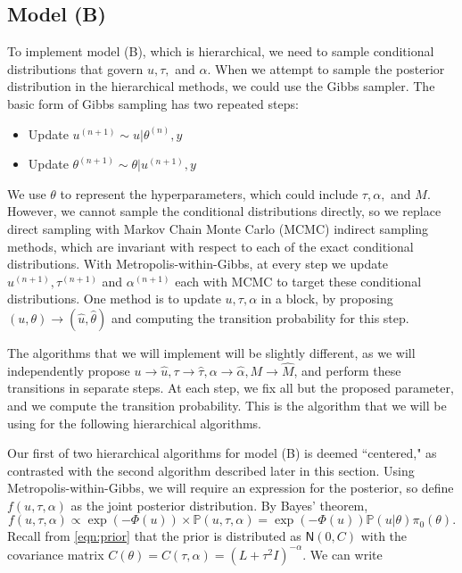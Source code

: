 \documentclass{siamart1116}
\begin{document}
    \subsection{Model (B)}
        To implement model (B), which is hierarchical, we need to sample conditional distributions that govern $u, \tau,$ and $\alpha$. When we attempt to sample the posterior distribution in the hierarchical methods, we could use the Gibbs sampler. The basic form of Gibbs sampling has two repeated steps:
        \begin{itemize}
        \item Update $u^{(n+1)} \sim u|\theta^{(n)}, y$
        \item Update $\theta^{(n+1)} \sim \theta|u^{(n+1)}, y$
        \end{itemize}
        We use $\theta$ to represent the hyperparameters, which could include $\tau, \alpha,$ and $M$. However, we cannot sample the conditional distributions directly, so we replace direct sampling with Markov Chain Monte Carlo (MCMC) indirect sampling methods, which are invariant with respect to each of the exact conditional distributions. With Metropolis-within-Gibbs, at every step we update $u^{(n+1)}, \tau^{(n+1)}$ and $\alpha^{(n+1)}$ each with MCMC to target these conditional distributions. One method is to update $u, \tau, \alpha$ in a block, by proposing $(u,\theta) \to  (\hat u, \hat \theta)$ and computing the transition probability for this step. 

        The algorithms that we will implement will be slightly different, as we will independently propose $u \to \hat u, \tau \to \hat \tau, \alpha \to \hat \alpha, M \to \hat M$, and perform these transitions in separate steps. At each step, we fix all but the proposed parameter, and we compute the transition probability. This is the algorithm that we will be using for the following hierarchical algorithms.

        Our first of two hierarchical algorithms for model (B) is deemed ``centered," as contrasted with the second algorithm described later in this section. Using Metropolis-within-Gibbs, we will require an expression for the posterior, so define $f(u,\tau,\alpha)$ as the joint posterior distribution. By Bayes' theorem, 
        \[f(u,\tau,\alpha) \propto \exp(-\Phi(u))\times\mathbb{P}(u,\tau,\alpha) = \exp(-\Phi(u))\mathbb{P}(u|\theta)\pi_0(\theta).\]
        Recall from \cref{eqn:prior} that the prior is distributed as $\mathsf{N}(0, C)$ with the covariance matrix $C(\theta) = C(\tau, \alpha) = (L + \tau^2I)^{-\alpha}$. We can write
\end{document}
